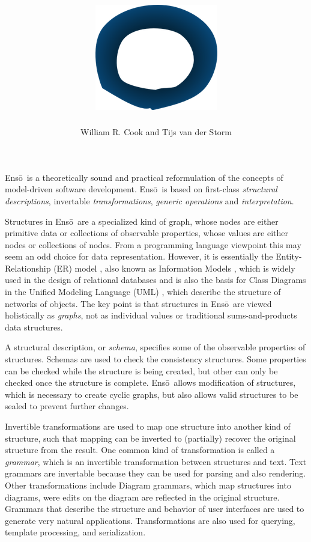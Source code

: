 \documentclass[11pt]{article}
\title{\includegraphics[scale=0.15]{enso.png}\\\Enso}
\author{William R. Cook and Tijs van der Storm}
\newcommand{\Enso}{Ens\={o}}
\begin{document}
\maketitle


\Enso\ is a theoretically sound and practical reformulation of the 
concepts of model-driven software development. \Enso\ is based
on first-class \textit{structural descriptions}, 
invertable \textit{transformations}, \textit{generic operations} 
and \textit{interpretation}.

Structures in \Enso\ are a specialized kind of graph,
whose nodes are either primitive data or collections of observable
properties, whose values are either nodes or collections of nodes.
From a programming language viewpoint this may seem an odd 
choice for data representation. However, it is essentially the
Entity-Relationship (ER) model \cite{FOO}, also known as Information
Models \cite{FOO}, which is widely used in the design of relational databases
and is also the basis for Class Diagrams in 
the Unified Modeling Language (UML) \cite{FOO}, which 
describe the structure of networks of objects.
The key point is that structures in \Enso\ are 
viewed holistically as \textit{graphs}, not as individual values
or traditional sums-and-products data structures.

A structural description, or \textit{schema}, specifies some 
of the observable properties of structures. Schemas are used to
check the consistency structures. Some properties can be checked
while the structure is being created, but other can only be checked
once the structure is complete. \Enso\ allows modification of structures,
which is necessary to create cyclic graphs, but also allows 
valid structures to be sealed to prevent further changes.

Invertible transformations are used to map one structure into
another kind of structure, such that mapping can be inverted to 
(partially) recover the original structure from the result.
One common kind of transformation is called a \textit{grammar},
which is an invertible transformation between structures and text.
Text grammars are invertable because they can be used for parsing
and also rendering. Other transformations include Diagram grammars,
which map structures into diagrams, were edits on the diagram are
reflected in the original structure. Grammars that describe
the structure and behavior of user interfaces are used to generate
very natural applications.
Transformations are also used for querying, template processing, 
and serialization.
\end{document}

